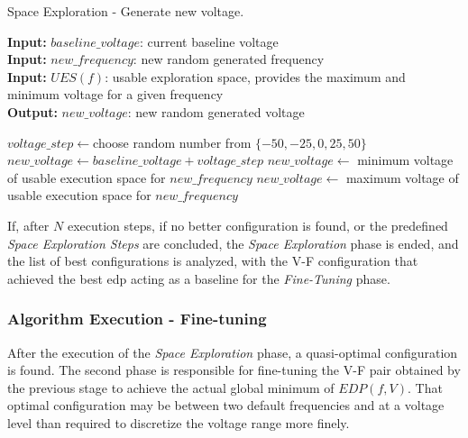 \begin{algorithm}
\caption{Space Exploration - Generate new voltage.}
    \label{alg:space-voltage} 
    \hspace*{\algorithmicindent} \textbf{Input:} $baseline\_voltage$: current baseline voltage \\
 \hspace*{\algorithmicindent} \textbf{Input:} $new\_frequency$: new random generated frequency \\
 \hspace*{\algorithmicindent} \textbf{Input:} $UES(f)$: usable exploration space, provides the maximum and minimum voltage for a given frequency \\
 \hspace*{\algorithmicindent} \textbf{Output:} $new\_voltage$: new random generated voltage
\begin{algorithmic}
\STATE $voltage\_step \leftarrow $choose random number from $\{-50, -25,0, 25, 50\}$
\STATE $new\_voltage \leftarrow baseline\_voltage + voltage\_step$
\STATE $new\_voltage \leftarrow$ minimum voltage of usable execution space for $new\_frequency$
\STATE $new\_voltage \leftarrow$ maximum voltage of usable execution space for $new\_frequency$
\ENDIF
\end{algorithmic}
\end{algorithm}


If, after $ N $ execution steps, if no better configuration is found, or the predefined \textit{Space Exploration Steps} are concluded, the \textit{Space Exploration} phase is ended, and the list of best configurations is analyzed, with the V-F configuration that achieved the best \acrshort{edp} acting as a baseline for the \textit{Fine-Tuning} phase.


\subsubsection{Algorithm Execution - Fine-tuning}

After the execution of the \textit{Space Exploration} phase, a quasi-optimal configuration is found. The second phase is responsible for fine-tuning the V-F pair obtained by the previous stage to achieve the actual global minimum of $EDP(f, V)$. That optimal configuration may be between two default frequencies and at a voltage level than required to discretize the voltage range more finely.

